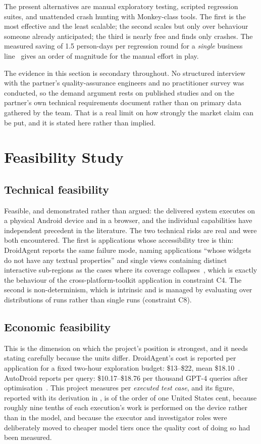 The present alternatives are manual exploratory testing, scripted regression
suites, and unattended crash hunting with Monkey-class tools. The first is the
most effective and the least scalable; the second scales but only over
behaviour someone already anticipated; the third is nearly free and finds only
crashes. The measured saving of 1.5 person-days per regression round for a
\emph{single} business line~\cite{auitestagent} gives an order of magnitude for
the manual effort in play.

The evidence in this section is secondary throughout. No structured interview
with the partner's quality-assurance engineers and no practitioner survey was
conducted, so the demand argument rests on published studies and on the
partner's own technical requirements document rather than on primary data
gathered by the team. That is a real limit on how strongly the market claim can
be put, and it is stated here rather than implied.

\section{Feasibility Study}
\label{sec:feasibility}

\subsection*{Technical feasibility}

Feasible, and demonstrated rather than argued: the delivered system executes on
a physical Android device and in a browser, and the individual capabilities
have independent precedent in the literature. The two technical risks are real
and were both encountered. The first is applications whose accessibility tree
is thin: DroidAgent reports the same failure mode, naming applications ``whose
widgets do not have any textual properties'' and single views containing
distinct interactive sub-regions as the cases where its coverage
collapses~\cite{droidagent}, which is exactly the behaviour of the
cross-platform-toolkit application in constraint C4. The second is
non-determinism, which is intrinsic and is managed by evaluating over
distributions of runs rather than single runs (constraint C8).

\subsection*{Economic feasibility}

This is the dimension on which the project's position is strongest, and it
needs stating carefully because the units differ. DroidAgent's cost is reported
per application for a fixed two-hour exploration budget: \$13--\$22, mean
\$18.10~\cite{droidagent}. AutoDroid reports per query: \$10.17--\$18.76 per
thousand GPT-4 queries after optimisation~\cite{autodroid}. This project
measures per \emph{executed test case}, and its figure, reported with its
derivation in , is of the order of one United States cent,
because roughly nine tenths of each execution's work is performed on the device
rather than in the model, and because the executor and investigator roles were
deliberately moved to cheaper model tiers once the quality cost of doing so had
been measured.

